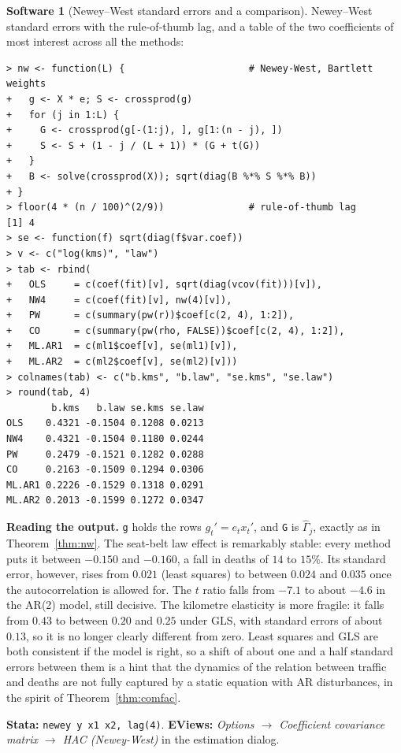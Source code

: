 \documentclass[11pt,a4paper]{article}
\numberwithin{equation}{section}
\theoremstyle{definition}
\newtheorem{software}[thm]{Software}
\begin{document}
\begin{software}[Newey--West standard errors and a comparison]
\label{sw:hac}
Newey--West standard errors with the rule-of-thumb lag, and a table of the two coefficients of most interest across all the methods:
{\small\begin{verbatim}
> nw <- function(L) {                      # Newey-West, Bartlett weights
+   g <- X * e; S <- crossprod(g)
+   for (j in 1:L) {
+     G <- crossprod(g[-(1:j), ], g[1:(n - j), ])
+     S <- S + (1 - j / (L + 1)) * (G + t(G))
+   }
+   B <- solve(crossprod(X)); sqrt(diag(B %*% S %*% B))
+ }
> floor(4 * (n / 100)^(2/9))               # rule-of-thumb lag
[1] 4
> se <- function(f) sqrt(diag(f$var.coef))
> v <- c("log(kms)", "law")
> tab <- rbind(
+   OLS     = c(coef(fit)[v], sqrt(diag(vcov(fit)))[v]),
+   NW4     = c(coef(fit)[v], nw(4)[v]),
+   PW      = c(summary(pw(r))$coef[c(2, 4), 1:2]),
+   CO      = c(summary(pw(rho, FALSE))$coef[c(2, 4), 1:2]),
+   ML.AR1  = c(ml1$coef[v], se(ml1)[v]),
+   ML.AR2  = c(ml2$coef[v], se(ml2)[v]))
> colnames(tab) <- c("b.kms", "b.law", "se.kms", "se.law")
> round(tab, 4)
        b.kms   b.law se.kms se.law
OLS    0.4321 -0.1504 0.1208 0.0213
NW4    0.4321 -0.1504 0.1180 0.0244
PW     0.2479 -0.1521 0.1282 0.0288
CO     0.2163 -0.1509 0.1294 0.0306
ML.AR1 0.2226 -0.1529 0.1318 0.0291
ML.AR2 0.2013 -0.1599 0.1272 0.0347
\end{verbatim}}
\textbf{Reading the output.} \texttt{g} holds the rows $g_t' = e_tx_t'$, and \texttt{G} is $\hat\Gamma_j$, exactly as in Theorem~\ref{thm:nw}. The seat-belt law effect is
remarkably stable: every method puts it between $-0.150$ and $-0.160$, a fall in deaths of $14$ to $15\%$. Its standard error, however, rises from $0.021$
(least squares) to between $0.024$ and $0.035$ once the autocorrelation is allowed for. The $t$ ratio falls from $-7.1$ to about $-4.6$ in the AR(2) model,
still decisive. The kilometre elasticity is more fragile: it falls from $0.43$ to between $0.20$ and $0.25$ under GLS, with standard errors of about $0.13$, so
it is no longer clearly different from zero. Least squares and GLS are both consistent if the model is right, so a shift of about one and a half
standard errors between them is a hint that the dynamics of the relation between traffic and deaths are not fully captured by a
static equation with AR disturbances, in the spirit of Theorem~\ref{thm:comfac}.

\textbf{Stata:} \texttt{newey y x1 x2, lag(4)}. \textbf{EViews:} \emph{Options $\to$ Coefficient covariance matrix $\to$ HAC (Newey-West)} in the estimation
dialog.
\end{software}
\end{document}
